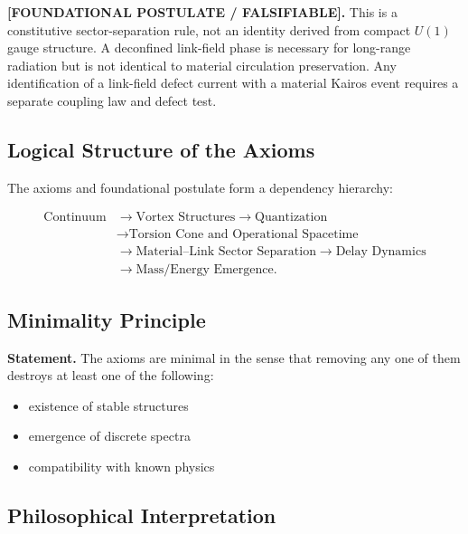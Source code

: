 \documentclass[11pt]{article}
\theoremstyle{definition}
\theoremstyle{plain}
\theoremstyle{remark}
\begin{document}
        \textbf{[FOUNDATIONAL POSTULATE / FALSIFIABLE].}
        This is a constitutive sector-separation rule, not an identity derived from
        compact \(U(1)\) gauge structure.  A deconfined link-field phase is necessary
        for long-range radiation but is not identical to material circulation
        preservation.  Any identification of a link-field defect current with a
        material Kairos event requires a separate coupling law and defect test.

    \subsection{Logical Structure of the Axioms}
        
        The axioms and foundational postulate form a dependency hierarchy:
        
        \begin{equation}
            \begin{aligned}
                \text{Continuum}
                &\rightarrow \text{Vortex Structures}
                \rightarrow \text{Quantization}\\
                &\rightarrow \text{Torsion Cone and Operational Spacetime}\\
                &\rightarrow \text{Material--Link Sector Separation}
                \rightarrow \text{Delay Dynamics}\\
                &\rightarrow \text{Mass/Energy Emergence}.
            \end{aligned}
        \end{equation}
    
    \subsection{Minimality Principle}
        
        \textbf{Statement.}
        The axioms are minimal in the sense that removing any one of them destroys at least one of the following:
        
        \begin{itemize}
            \item existence of stable structures
            \item emergence of discrete spectra
            \item compatibility with known physics
        \end{itemize}
    
    \subsection{Philosophical Interpretation}
        
\end{document}
